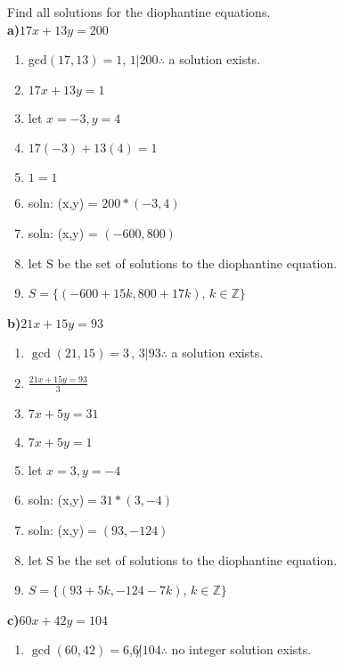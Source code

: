 \documentclass[12pt]{article}
\newcommand{\Z}{\mathbb{Z}}
\newenvironment{question}[2][Question]{\begin{trivlist}
\item[\hskip \labelsep {\bfseries #1}\hskip \labelsep {\bfseries #2.}]}{\end{trivlist}}
\newenvironment{level}%
{\addtolength{\itemindent}{2em}}%
{\addtolength{\itemindent}{-2em}}
\begin{document}
\begin{question}{6.9}
Find all solutions for the diophantine equations.\\
%
\textbf{a)}$17x+13y=200$
\begin{enumerate}
	\item gcd$(17,13) = 1 $, $ 1 | 200 \therefore$ a solution exists.
	\item $17x+13y=1$
	\begin{level}
		\item let $x=-3,y=4$
		\item $17(-3)+13(4)=1$ 
		\item $1=1$
	\end{level}
	\item soln: (x,y) = $200*(-3,4)$
	\begin{level}
		\item soln: (x,y) = $(-600,800)$
	\end{level}
	\item let S be the set of solutions to the diophantine equation.
	\item $S = \{(-600+15k, 800+17k )$, $k \in \Z \}$
\end{enumerate}
%
\textbf{b)}$21x+15y=93$
\begin{enumerate}
	\item $\gcd(21,15) = 3\, , \, 3 | 93 \therefore $ a solution exists.
	\item $\frac{21x+15y=93}{3}$
	\item $7x+5y=31$
	\begin{level} 
		\item $7x+5y=1$
		\item let $x=3,y=-4$
		\item soln: (x,y)$=31*(3,-4)$
		\item soln: (x,y)$=(93,-124)$
	\end{level}
	\item let S be the set of solutions to the diophantine equation.
	\item $S = \{(93+5k, -124-7k) $, $k \in \Z \}$ 
\end{enumerate}

\textbf{c)}$60x+42y=104$
\begin{enumerate}
	\item $\gcd(60,42)=6$,$6 \not | 104 \therefore $ no integer solution exists.
\end{enumerate}


\end{question}
\end{document}
